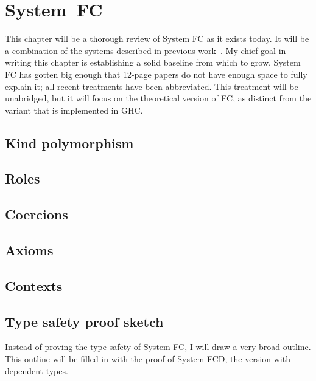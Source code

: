 \chapter{System~FC}
\label{cha:system-fc}

\begin{proposal}
This chapter will be a thorough review of System FC as it exists today.
It will be a combination of the systems described in previous
work~\cite{promotion,safe-coercions,closed-type-families}. My chief
goal in writing this chapter is establishing a solid baseline from which
to grow. System FC has gotten big enough that 12-page papers do not have
enough space to fully explain it; all recent treatments have been abbreviated.
This treatment will be unabridged, but it will focus on the theoretical
version of FC, as distinct from the variant that is implemented in GHC.
\end{proposal}

\section{Kind polymorphism}

\section{Roles}

\section{Coercions}

\section{Axioms}

\section{Contexts}

\section{Type safety proof sketch}

\begin{proposal}
Instead of proving the type safety of System FC, I will draw a very broad
outline. This outline will be filled in with the proof of System FCD, the
version with dependent types.
\end{proposal}
